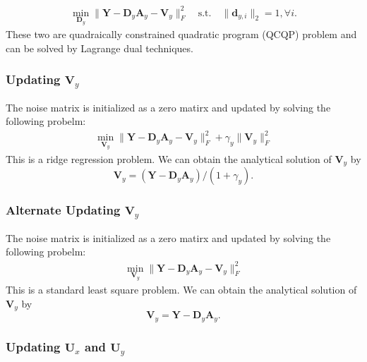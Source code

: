 \documentclass[10pt,twocolumn,letterpaper]{article}
\begin{document}
\begin{equation}
\begin{split}
\min_{\mathbf{D}_{y}}
\|\mathbf{Y}-\mathbf{D}_{y}\mathbf{A}_{y}-\mathbf{V}_{y}\|_{F}^{2}
\quad 
\text{s.t.}
\quad 
\|\mathbf{d}_{y,i}\|_{2}=1,
\forall{i}.
\end{split}
\end{equation}
These two are quadraically constrained quadratic program (QCQP) problem and can be solved by Lagrange dual techniques.

\subsubsection{Updating $\mathbf{V}_{y}$}
The noise matrix is initialized as a zero matirx and updated by solving the following probelm:
\begin{equation}
\begin{split}
\min_{\mathbf{V}_{y}}
\|\mathbf{Y}-\mathbf{D}_{y}\mathbf{A}_{y}-\mathbf{V}_{y}\|_{F}^{2}
+
\gamma_{y}\|\mathbf{V}_{y}\|_{F}^{2}
\end{split}
\end{equation}
This is a ridge regression problem. We can obtain the analytical solution of $\mathbf{V}_{y}$ by 
\begin{equation}
\mathbf{V}_{y} = (\mathbf{Y}-\mathbf{D}_{y}\mathbf{A}_{y})/(1+\gamma_{y}).
\end{equation}

\subsubsection{Alternate Updating $\mathbf{V}_{y}$}
The noise matrix is initialized as a zero matirx and updated by solving the following probelm:
\begin{equation}
\begin{split}
\min_{\mathbf{V}_{y}}
\|\mathbf{Y}-\mathbf{D}_{y}\mathbf{A}_{y}-\mathbf{V}_{y}\|_{F}^{2}
\end{split}
\end{equation}
This is a standard least square problem. We can obtain the analytical solution of $\mathbf{V}_{y}$ by 
\begin{equation}
\mathbf{V}_{y} = \mathbf{Y}-\mathbf{D}_{y}\mathbf{A}_{y}.
\end{equation}



\subsubsection{Updating $\mathbf{U}_{x}$ and $\mathbf{U}_{y}$}
\end{document}
